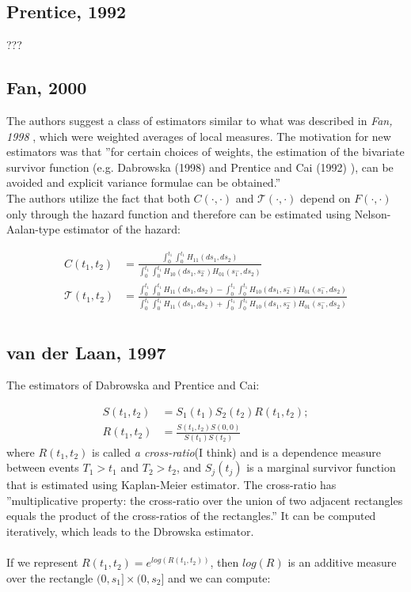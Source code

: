 \documentclass[]{article}
\begin{document}
\subsection{Prentice, 1992 \cite{prentice1992covariance}}
???

\subsection{Fan, 2000 \cite{fan2000class}}
The authors suggest a class of estimators similar to what was described in \emph{Fan, 1998} \cite{fan2000dependence}, which were weighted averages of local measures. The motivation for new estimators was that ''for certain choices of weights, the estimation of the bivariate survivor function (e.g. Dabrowska (1998)\cite{dabrowska1988kaplan} and Prentice and Cai (1992) \cite{prentice1992covariance}), can be avoided and explicit variance formulae can be obtained.''\\
The authors utilize the fact that both $C(\cdot, \cdot)$ and $\mathcal{T}(\cdot, \cdot)$ depend on $F(\cdot, \cdot)$ only through the hazard function and therefore can be estimated using Nelson-Aalan-type estimator of the hazard:

	$$
	\begin{aligned}
    C(t_1, t_2) &= \frac{\int_0^{t_1}\int_0^{t_1} H_{11}(ds_1, ds_2)}{\int_0^{t_1}\int_0^{t_1} H_{10}(ds_1, s_2^-)H_{01}(s_1^-, ds_2)}\\
    \mathcal{T}(t_1, t_2) &= \frac{\int_0^{t_1}\int_0^{t_1} H_{11}(ds_1, ds_2) - \int_0^{t_1}\int_0^{t_1} H_{10}(ds_1, s_2^-)H_{01}(s_1^-, ds_2) }{\int_0^{t_1}\int_0^{t_1} H_{11}(ds_1, ds_2) + \int_0^{t_1}\int_0^{t_1} H_{10}(ds_1, s_2^-)H_{01}(s_1^-, ds_2) }\\
	\end{aligned}
	$$

\subsection{van der Laan, 1997 \cite{van1997nonparametric}}
The estimators of Dabrowska and Prentice and Cai:

	$$
	\begin{aligned}
    S(t_1, t_2) &= S_1(t_1)S_2(t_2)R(t_1, t_2);\\
		R(t_1, t_2) &= \frac{S(t_1, t_2)S(0, 0)}{S(t_1)S(t_2)}
 	\end{aligned}
	$$
where $R(t_1, t_2)$ is called \emph{a cross-ratio}(I think) and is a dependence measure between events $T_1>t_1$ and $T_2>t_2$, and $S_j(t_j)$ is a marginal survivor function that is estimated using Kaplan-Meier estimator. The cross-ratio has ''multiplicative property: the cross-ratio over the union of two adjacent rectangles equals the product of the cross-ratios of the rectangles.'' It can be computed iteratively, which leads to the Dbrowska estimator.\\
\\
If we represent $R(t_1, t_2) = e^{log(R(t_1, t_2))}$, then $log(R)$ is  an additive measure over the rectangle $(0,s_1]\times(0,s_2]$ and we can compute:
	
\end{document}
